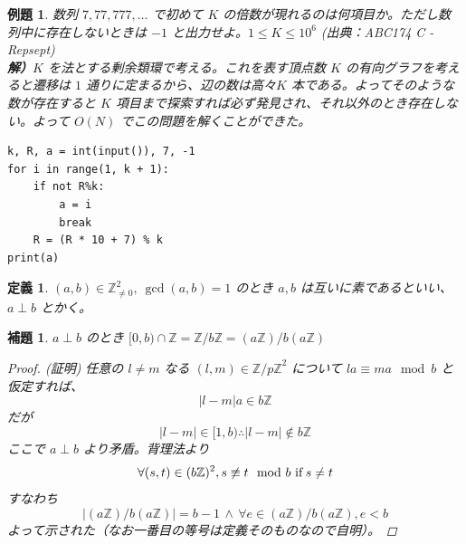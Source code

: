 \documentclass[12pt, a4j]{ltjsarticle}
\newtheorem{lem}[thm]{補題}
\newtheorem{defi}[thm]{定義}
\newtheorem{exm}[thm]{例題}
\newcommand*{\ZZ}{\mathbb{Z}}
\begin{document}
\begin{exm} \upshape 数列 $7,77,777,\ldots$ で初めて $K$ の倍数が現れるのは何項目か。ただし数列中に存在しないときは $-1$ と出力せよ。$1\le K \le 10^6$ \quad(出典：ABC174 C - Repsept) \\
{\bf 解）}$K$ を法とする剰余類環で考える。これを表す頂点数 $K$ の有向グラフを考えると遷移は $1$ 通りに定まるから、辺の数は高々$K$ 本である。よってそのような数が存在すると $K$ 項目まで探索すれば必ず発見され、それ以外のとき存在しない。よって $O(N)$ でこの問題を解くことができた。
\\
\begin{lstlisting}
k, R, a = int(input()), 7, -1
for i in range(1, k + 1):
    if not R%k:
        a = i
        break
    R = (R * 10 + 7) % k
print(a)
\end{lstlisting}
\end{exm}

\begin{defi} $(a,b)\in\mathbb{Z}_{\neq0}^2,\ \gcd(a,b)=1$ のとき $a,b$ は互いに素であるといい、 $a\perp b$ とかく。
\end{defi}

\vspace{1cm}

\begin{lem} $a\perp b$ のとき $[0,b)\cap\ZZ = \mathbb{Z}/b\mathbb{Z} = (a\mathbb{Z})/b(a\mathbb{Z})$ \label{exists}
\begin{proof} (証明)
任意の $l\neq m$ なる $(l,m)\in {\ZZ/p\ZZ}^2$ について $la \equiv ma \mod b$ と仮定すれば、
\begin{equation}
|l-m|a\in b\mathbb{Z}
\end{equation} だが
\begin{equation}
|l-m|\in[1,b) \therefore |l-m| \notin b\mathbb{Z}
\end{equation}ここで $a \perp b$ より矛盾。背理法より \begin{equation}
\forall (s, t) \in (b\mathbb{Z})^2, s \not \equiv t \mod b {\,\,\rm if\,} s \neq t\end{equation}すなわち
\begin{equation}\left|(a\mathbb{Z})/b(a\mathbb{Z})\right|=b-1\, \land\, \forall e \in (a\mathbb{Z})/b(a\mathbb{Z}), e<b
\end{equation} よって示された（なお一番目の等号は定義そのものなので自明）。
\end{proof}
\end{lem}

\vspace{1cm}
\end{document}
